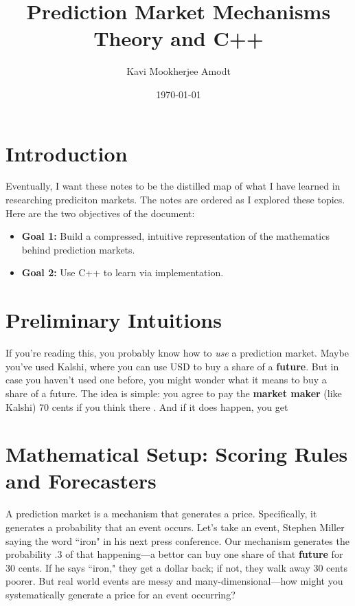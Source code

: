 \documentclass[11pt, a4paper]{article}
\title{\textbf{Prediction Market Mechanisms} \\ \large Theory and C++}
\author{Kavi Mookherjee Amodt}
\date{\today}
\theoremstyle{definition}
\begin{document}
\maketitle
\tableofcontents
\pagebreak

\section{Introduction}
Eventually, I want these notes to be the distilled map of what I have learned in researching prediciton markets. The notes are ordered as I explored these topics. Here are the two objectives of the document: 
\begin{itemize}
    \item \textbf{Goal 1:} Build a compressed, intuitive representation of the mathematics behind prediction markets. 
    \item \textbf{Goal 2:} Use C++ to learn via implementation. 
\end{itemize}

\section{Preliminary Intuitions}
If you're reading this, you probably know how to \textit{use} a prediction market. 
Maybe you've used Kalshi, where you can use USD to buy a share of a \textbf{future}. 
But in case you haven't used one before, you might wonder what it means to buy a share
of a future. The idea is simple: you agree to pay the \textbf{market maker} (like Kalshi)
$70$ cents if you think there . And if it does happen, you get 





\section{Mathematical Setup: Scoring Rules and Forecasters}
A prediction market is a mechanism that generates a price. Specifically, 
it generates a probability that an event occurs. Let's take 
an event, Stephen Miller saying the word ``iron" in his next press conference. 
Our mechanism generates the probability .3 of that happening—a bettor can buy 
one share of that \textbf{future} for 30 cents. If he says ``iron," they get a dollar back; if not, 
they walk away 30 cents poorer. But real world events are messy and many-dimensional—how 
might you systematically generate a price for an event occurring?
\end{document}

